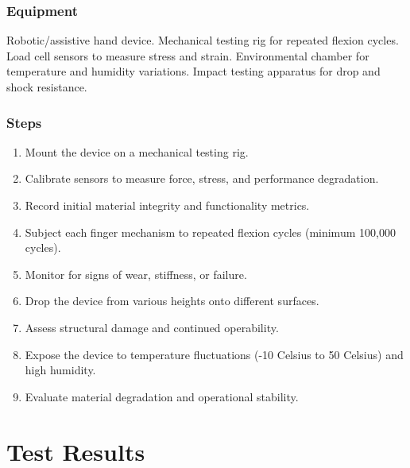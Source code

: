 \documentclass{article}
\begin{document}
\subsubsection{Equipment} Robotic/assistive hand device. Mechanical testing rig for repeated flexion cycles. Load cell sensors to measure stress and strain. Environmental chamber for temperature and humidity variations. Impact testing apparatus for drop and shock resistance.

\subsubsection{Steps}
\begin{enumerate}
    \item Mount the device on a mechanical testing rig.
    \item Calibrate sensors to measure force, stress, and performance degradation.
    \item Record initial material integrity and functionality metrics.
    \item Subject each finger mechanism to repeated flexion cycles (minimum 100,000 cycles).
    \item Monitor for signs of wear, stiffness, or failure.
    \item Drop the device from various heights onto different surfaces. 
    \item Assess structural damage and continued operability.
    \item Expose the device to temperature fluctuations (-10 Celsius to 50 Celsius) and high humidity.
    \item Evaluate material degradation and operational stability.
\end{enumerate}

\section{Test Results}
\end{document}
